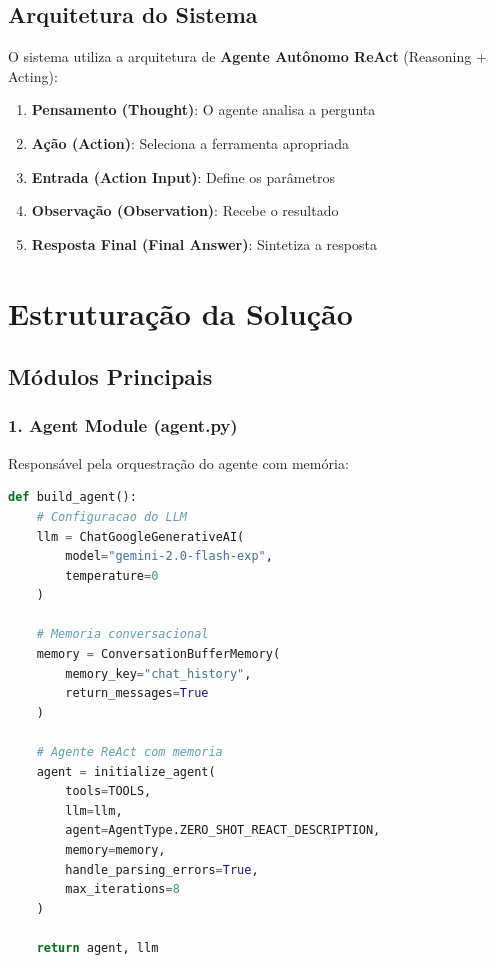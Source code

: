 \documentclass[12pt,a4paper]{article}
\begin{document}
\subsection{Arquitetura do Sistema}

O sistema utiliza a arquitetura de \textbf{Agente Autônomo ReAct} (Reasoning + Acting):

\begin{enumerate}
    \item \textbf{Pensamento (Thought)}: O agente analisa a pergunta
    \item \textbf{Ação (Action)}: Seleciona a ferramenta apropriada
    \item \textbf{Entrada (Action Input)}: Define os parâmetros
    \item \textbf{Observação (Observation)}: Recebe o resultado
    \item \textbf{Resposta Final (Final Answer)}: Sintetiza a resposta
\end{enumerate}

\newpage
\section{Estruturação da Solução}

\subsection{Módulos Principais}

\subsubsection{1. Agent Module (agent.py)}

Responsável pela orquestração do agente com memória:

\begin{lstlisting}[language=Python, caption=Inicialização do Agente]
def build_agent():
    # Configuracao do LLM
    llm = ChatGoogleGenerativeAI(
        model="gemini-2.0-flash-exp",
        temperature=0
    )
    
    # Memoria conversacional
    memory = ConversationBufferMemory(
        memory_key="chat_history",
        return_messages=True
    )
    
    # Agente ReAct com memoria
    agent = initialize_agent(
        tools=TOOLS,
        llm=llm,
        agent=AgentType.ZERO_SHOT_REACT_DESCRIPTION,
        memory=memory,
        handle_parsing_errors=True,
        max_iterations=8
    )
    
    return agent, llm
\end{lstlisting}
\end{document}
